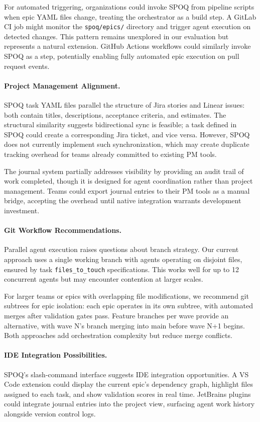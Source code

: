 For automated triggering, organizations could invoke SPOQ from pipeline
scripts when epic YAML files change, treating the orchestrator as a
build step. A GitLab CI job might monitor the \texttt{spoq/epics/}
directory and trigger agent execution on detected changes. This pattern
remains unexplored in our evaluation but represents a natural extension.
GitHub Actions workflows could similarly invoke SPOQ as a step,
potentially enabling fully automated epic execution on pull request events.

\paragraph{Project Management Alignment.}
SPOQ task YAML files parallel the structure of Jira stories and Linear
issues: both contain titles, descriptions, acceptance criteria, and
estimates. The structural similarity suggests bidirectional sync is
feasible; a task defined in SPOQ could create a corresponding Jira
ticket, and vice versa. However, SPOQ does not currently implement
such synchronization, which may create duplicate tracking overhead
for teams already committed to existing PM tools.

The journal system partially addresses visibility by providing an
audit trail of work completed, though it is designed for agent
coordination rather than project management. Teams could export
journal entries to their PM tools as a manual bridge, accepting
the overhead until native integration warrants development investment.

\paragraph{Git Workflow Recommendations.}
Parallel agent execution raises questions about branch strategy.
Our current approach uses a single working branch with agents
operating on disjoint files, ensured by task \texttt{files\_to\_touch}
specifications. This works well for up to 12 concurrent agents
but may encounter contention at larger scales.

For larger teams or epics with overlapping file modifications,
we recommend git subtrees for epic isolation: each epic operates
in its own subtree, with automated merges after validation gates
pass. Feature branches per wave provide an alternative, with
wave N's branch merging into main before wave N+1 begins. Both
approaches add orchestration complexity but reduce merge conflicts.

\paragraph{IDE Integration Possibilities.}
SPOQ's slash-command interface suggests IDE integration opportunities.
A VS Code extension could display the current epic's dependency graph,
highlight files assigned to each task, and show validation scores
in real time. JetBrains plugins could integrate journal entries
into the project view, surfacing agent work history alongside
version control logs.

